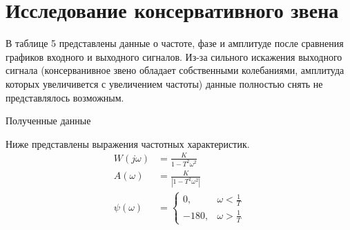 \documentclass[a4paper, 12pt]{article}
\begin{document}
\newpage
\section{Исследование консервативного звена}
В таблице 5 представлены данные о частоте, фазе и амплитуде после сравнения графиков входного и выходного сигналов. Из-за сильного искажения выходного сигнала (консерванивное звено обладает собственными колебаниями, амплитуда которых увеличивется с увеличением частоты) данные полностью снять не представлялось возможным. \par
\begin{table}[h!]
    \centering
    \begin{threeparttable}
        \caption{Полученные данные}
    \end{threeparttable}
\end{table}

Ниже представлены выражения частотных характеристик.
\begin{align}
    W(j\omega) & = \frac{K}{1 - T^2\omega^2} \\
    A(\omega) & = \frac{K}{|1 - T^2\omega^2|} \\ 
    \psi(\omega) & = \begin{cases}
        0, & \omega < \frac{1}{T} \\
        -180, & \omega > \frac{1}{T}
    \end{cases}
\end{align}
\end{document}
